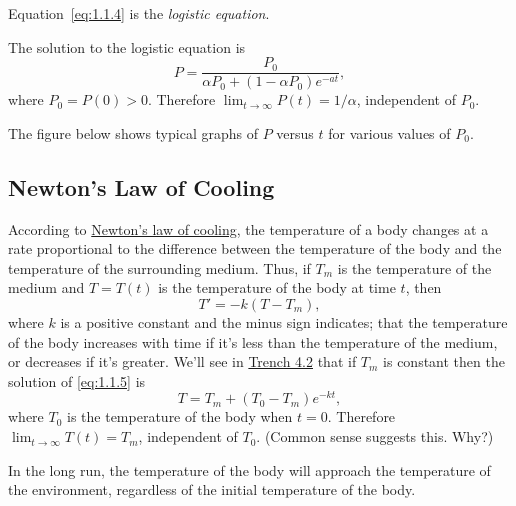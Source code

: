 \documentclass{ximera}
\begin{document}
Equation~\eqref{eq:1.1.4} is  the \textit{logistic equation}.
 
 
The solution to the logistic equation is
$$
P=\frac{P_0}{\alpha P_0+(1-\alpha P_0)e^{-at}},
$$
where $P_0=P(0)>0$. Therefore
$\lim_{t\to\infty}P(t)=1/\alpha$, independent of $P_0$.
 
The figure below shows typical graphs of $P$ versus $t$ for
various values of  $P_0$.

\begin{center}
\end{center}
 

 
 
\subsection*{Newton's Law of Cooling}
 
According to
\href{http://www-history.mcs.st-and.ac.uk/Mathematicians/Newton.html}{Newton's law of cooling},  the temperature of a
body changes at a rate proportional to the difference between the
temperature of the body and the temperature of the surrounding medium.
 Thus, if  $T_m$ is the temperature of the
medium and
$T=T(t)$ is the temperature of the body at time $t$, then
\begin{equation} \label{eq:1.1.5}
T' = -k(T-T_m),
\end{equation}
where $k$ is a positive constant and the  minus sign indicates;   that
the temperature of the body increases with time if it's less than the
temperature of the medium, or decreases if it's  greater. We'll see
in \href{https://ximera.osu.edu/ode/main/mixingProblems/mixingProblems}{Trench 4.2} that if
$T_m$ is constant then the solution of \eqref{eq:1.1.5} is
\begin{equation} \label{eq:1.1.6}
T=T_m+(T_0-T_m)e^{-kt},
\end{equation}
where $T_0$ is the temperature of the body when $t=0$.
Therefore $\lim_{t\to\infty}T(t)=T_m$, independent of $T_0$.
(Common sense suggests this. Why?)

\begin{solution}
In the long run, the temperature of the body will approach the temperature of the environment,  regardless of the initial temperature of the body.
\end{solution}
\end{document}
